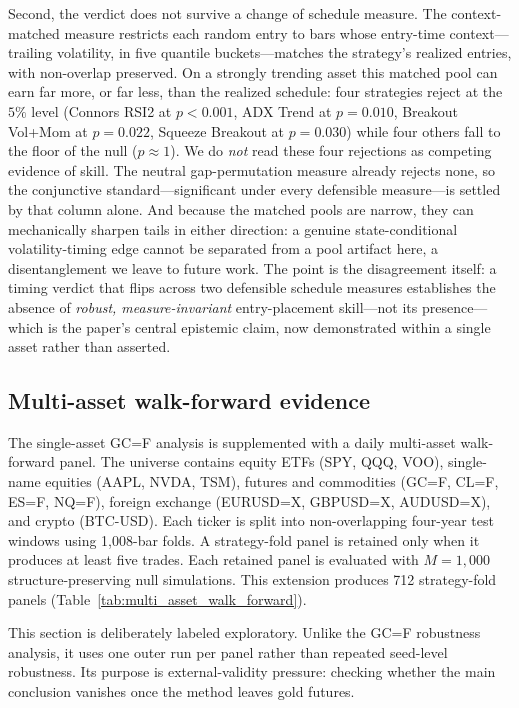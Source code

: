 \documentclass[preprint,12pt]{elsarticle}
\theoremstyle{definition}
\begin{document}
Second, the verdict does not survive a change of schedule measure. The context-matched measure restricts each random entry to bars whose entry-time context---trailing volatility, in five quantile buckets---matches the strategy's realized entries, with non-overlap preserved. On a strongly trending asset this matched pool can earn far more, or far less, than the realized schedule: four strategies reject at the $5\%$ level (Connors RSI2 at $p<0.001$, ADX Trend at $p=0.010$, Breakout Vol+Mom at $p=0.022$, Squeeze Breakout at $p=0.030$) while four others fall to the floor of the null ($p\approx 1$). We do \emph{not} read these four rejections as competing evidence of skill. The neutral gap-permutation measure already rejects none, so the conjunctive standard---significant under every defensible measure---is settled by that column alone. And because the matched pools are narrow, they can mechanically sharpen tails in either direction: a genuine state-conditional volatility-timing edge cannot be separated from a pool artifact here, a disentanglement we leave to future work. The point is the disagreement itself: a timing verdict that flips across two defensible schedule measures establishes the absence of \emph{robust, measure-invariant} entry-placement skill---not its presence---which is the paper's central epistemic claim, now demonstrated within a single asset rather than asserted.

\subsection{Multi-asset walk-forward evidence}

The single-asset GC=F analysis is supplemented with a daily multi-asset walk-forward panel. The universe contains equity ETFs (SPY, QQQ, VOO), single-name equities (AAPL, NVDA, TSM), futures and commodities (GC=F, CL=F, ES=F, NQ=F), foreign exchange (EURUSD=X, GBPUSD=X, AUDUSD=X), and crypto (BTC-USD). Each ticker is split into non-overlapping four-year test windows using 1{,}008-bar folds. A strategy-fold panel is retained only when it produces at least five trades. Each retained panel is evaluated with $M=1{,}000$ structure-preserving null simulations. This extension produces 712 strategy-fold panels (Table~\ref{tab:multi_asset_walk_forward}).

This section is deliberately labeled exploratory. Unlike the GC=F robustness analysis, it uses one outer run per panel rather than repeated seed-level robustness. Its purpose is external-validity pressure: checking whether the main conclusion vanishes once the method leaves gold futures.
\end{document}

